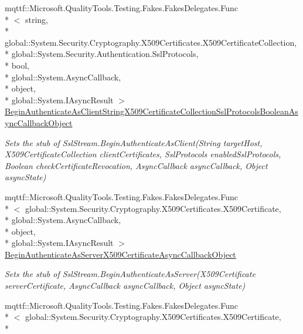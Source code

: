 \begin{DoxyCompactItemize}
mqttf\-::\-Microsoft.\-Quality\-Tools.\-Testing.\-Fakes.\-Fakes\-Delegates.\-Func\\*
$<$ string, \\*
global\-::\-System.\-Security.\-Cryptography.\-X509\-Certificates.\-X509\-Certificate\-Collection, \\*
global\-::\-System.\-Security.\-Authentication.\-Ssl\-Protocols, \\*
bool, \\*
global\-::\-System.\-Async\-Callback, \\*
object, \\*
global\-::\-System.\-I\-Async\-Result $>$ \hyperlink{class_system_1_1_net_1_1_security_1_1_fakes_1_1_stub_ssl_stream_a56a22f609b0ec4b7d4dee50b2afae7da}{Begin\-Authenticate\-As\-Client\-String\-X509\-Certificate\-Collection\-Ssl\-Protocols\-Boolean\-Async\-Callback\-Object}
\begin{DoxyCompactList}\small\item\em Sets the stub of Ssl\-Stream.\-Begin\-Authenticate\-As\-Client(\-String target\-Host, X509\-Certificate\-Collection client\-Certificates, Ssl\-Protocols enabled\-Ssl\-Protocols, Boolean check\-Certificate\-Revocation, Async\-Callback async\-Callback, Object async\-State)\end{DoxyCompactList}\item 
mqttf\-::\-Microsoft.\-Quality\-Tools.\-Testing.\-Fakes.\-Fakes\-Delegates.\-Func\\*
$<$ global\-::\-System.\-Security.\-Cryptography.\-X509\-Certificates.\-X509\-Certificate, \\*
global\-::\-System.\-Async\-Callback, \\*
object, \\*
global\-::\-System.\-I\-Async\-Result $>$ \hyperlink{class_system_1_1_net_1_1_security_1_1_fakes_1_1_stub_ssl_stream_aad4faaf059a8ea40dbb004f1b4f37bc8}{Begin\-Authenticate\-As\-Server\-X509\-Certificate\-Async\-Callback\-Object}
\begin{DoxyCompactList}\small\item\em Sets the stub of Ssl\-Stream.\-Begin\-Authenticate\-As\-Server(\-X509\-Certificate server\-Certificate, Async\-Callback async\-Callback, Object async\-State)\end{DoxyCompactList}\item 
mqttf\-::\-Microsoft.\-Quality\-Tools.\-Testing.\-Fakes.\-Fakes\-Delegates.\-Func\\*
$<$ global\-::\-System.\-Security.\-Cryptography.\-X509\-Certificates.\-X509\-Certificate, \\*

\end{DoxyCompactItemize}
